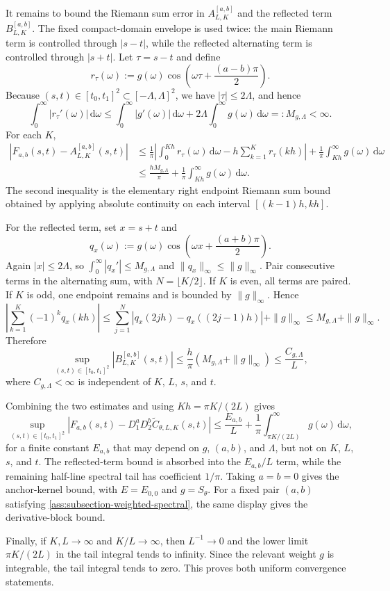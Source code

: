 \documentclass[11pt,a4paper]{article}
\theoremstyle{definition}
\theoremstyle{remark}
\begin{document}
\begin{mainproof}
It remains to bound the Riemann sum error in $A_{L,K}^{[a,b]}$ and the reflected term $B_{L,K}^{[a,b]}$. The fixed compact-domain envelope is used twice: the main Riemann term is controlled through \(|s-t|\), while the reflected alternating term is controlled through \(|s+t|\). Let $\tau=s-t$ and define
\[
    r_\tau(\omega)
    :=g(\omega)\cos\!\left(\omega\tau+\frac{(a-b)\pi}{2}\right).
\]
Because $(s,t)\in[t_0,t_1]^2\subset[-\Lambda,\Lambda]^2$, we have $|\tau|\le 2\Lambda$, and hence
\[
\int_0^\infty |r_\tau'(\omega)|\,\mathrm d\omega
\le
\int_0^\infty |g'(\omega)|\,\mathrm d\omega
+2\Lambda\int_0^\infty g(\omega)\,\mathrm d\omega
=:M_{g,\Lambda}<\infty .
\]
For each $K$,
\begin{align*}
\left|F_{a,b}(s,t)-A_{L,K}^{[a,b]}(s,t)\right|
&\le
\frac{1}{\pi}
\left|\int_0^{Kh} r_\tau(\omega)\,\mathrm d\omega
      -h\sum_{k=1}^K r_\tau(kh)\right|
+
\frac{1}{\pi}\int_{Kh}^\infty g(\omega)\,\mathrm d\omega  \\
&\le
\frac{hM_{g,\Lambda}}{\pi}
+
\frac{1}{\pi}\int_{Kh}^\infty g(\omega)\,\mathrm d\omega .
\end{align*}
The second inequality is the elementary right endpoint Riemann sum bound obtained by applying absolute continuity on each interval $[(k-1)h,kh]$.

For the reflected term, set $x=s+t$ and
\[
    q_x(\omega)
    :=g(\omega)\cos\!\left(\omega x+\frac{(a+b)\pi}{2}\right).
\]
Again $|x|\le 2\Lambda$, so $\int_0^\infty |q_x'|\le M_{g,\Lambda}$ and $\|q_x\|_\infty\le\|g\|_\infty$. Pair consecutive terms in the alternating sum, with \(N=\lfloor K/2\rfloor\). If \(K\) is even, all terms are paired. If \(K\) is odd, one endpoint remains and is bounded by \(\|g\|_\infty\). Hence
\[
\left|\sum_{k=1}^K(-1)^k q_x(kh)\right|
\le
\sum_{j=1}^N |q_x(2jh)-q_x((2j-1)h)|+\|g\|_\infty
\le
M_{g,\Lambda}+\|g\|_\infty .
\]
Therefore
\[
\sup_{(s,t)\in[t_0,t_1]^2}
\left|B_{L,K}^{[a,b]}(s,t)\right|
\le
\frac{h}{\pi}(M_{g,\Lambda}+\|g\|_\infty)
\le
\frac{C_{g,\Lambda}}{L},
\]
where $C_{g,\Lambda}<\infty$ is independent of $K$, $L$, $s$, and $t$.

Combining the two estimates and using $Kh=\pi K/(2L)$ gives
\[
\sup_{(s,t)\in[t_0,t_1]^2}
\left|F_{a,b}(s,t)-D_1^aD_2^b\widetilde C_{\theta,L,K}(s,t)\right|
\le
\frac{E_{a,b}}{L}
+
\frac{1}{\pi}\int_{\pi K/(2L)}^\infty g(\omega)\,\mathrm d\omega,
\]
for a finite constant $E_{a,b}$ that may depend on \(g\), \((a,b)\), and \(\Lambda\), but not on $K$, $L$, $s$, and $t$. The reflected-term bound is absorbed into the \(E_{a,b}/L\) term, while the remaining half-line spectral tail has coefficient \(1/\pi\). Taking $a=b=0$ gives the anchor-kernel bound, with $E=E_{0,0}$ and $g=S_\theta$. For a fixed pair $(a,b)$ satisfying \cref{ass:subsection-weighted-spectral}, the same display gives the derivative-block bound.

Finally, if $K,L\to\infty$ and $K/L\to\infty$, then $L^{-1}\to0$ and the lower limit $\pi K/(2L)$ in the tail integral tends to infinity. Since the relevant weight $g$ is integrable, the tail integral tends to zero. This proves both uniform convergence statements.
\end{mainproof}
\end{document}

